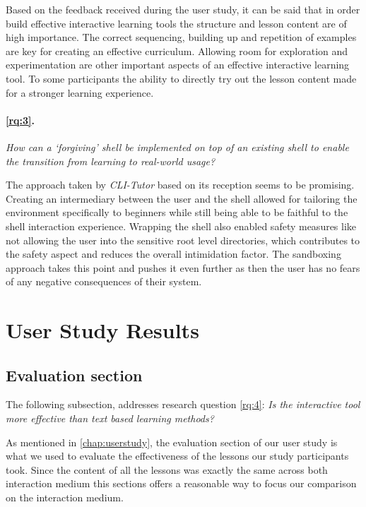 Based on the feedback received during the user study, it can be said that in
order build effective interactive learning tools the structure and lesson
content are of high importance. The correct sequencing, building up and
repetition of examples are key for creating an effective curriculum. Allowing
room for exploration and experimentation are other important aspects of an
effective interactive learning tool. To some participants the ability to
directly try out the lesson content made for a stronger learning experience.



\paragraph{\ref{rq:3}.} \textit{How can a `forgiving' shell be implemented on top of an existing
	shell to enable the transition from learning to real-world usage?}

The approach taken by \textit{CLI-Tutor} based on its reception seems to be
promising. Creating an intermediary between the user and the shell allowed for
tailoring the environment specifically to beginners while still being able to
be faithful to the shell interaction experience. Wrapping the shell also enabled
safety measures like not allowing the user into the sensitive root level
directories, which contributes to the safety aspect and reduces the overall
intimidation factor. The sandboxing approach takes this point and pushes it
even further as then the user has no fears of any negative consequences of their system.



\section{User Study Results}

\subsection{Evaluation section}

The following subsection, addresses research question \ref{rq:4}: \textit{Is
	the interactive tool more effective than text based learning
	methods?}

As mentioned in \autoref{chap:userstudy}, the evaluation section of our user
study is what we used to evaluate the effectiveness of the lessons our study
participants took. Since the content of all the lessons was exactly the same
across both interaction medium this sections offers a reasonable way to focus
our comparison on the interaction medium.

